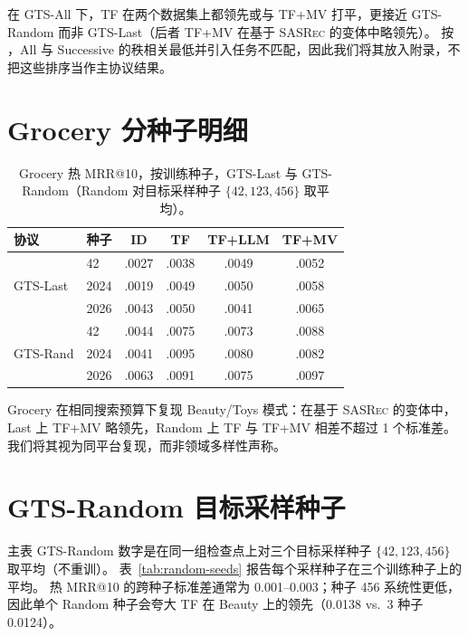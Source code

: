 \documentclass[sigconf,natbib=true,anonymous]{acmart}
\newcommand{\tfmv}{\textsc{TF+MV}\xspace}
\newcommand{\base}{\textsc{SASRec}\xspace}
\begin{document}
在 GTS-All 下，TF 在两个数据集上都领先或与 \tfmv 打平，更接近 GTS-Random 而非 GTS-Last（后者 \tfmv 在基于 \base 的变体中略领先）。
按 \citet{gusak2025time}，All 与 Successive 的秩相关最低并引入任务不匹配，因此我们将其放入附录，不把这些排序当作主协议结果。

\section{Grocery 分种子明细}
\label{app:grocery}

\begin{table}[h]
\centering
\caption{Grocery 热 MRR@10，按训练种子，GTS-Last 与 GTS-Random（Random 对目标采样种子 $\{42,123,456\}$ 取平均）。}
\label{tab:grocery-perseed}
\small
\setlength{\tabcolsep}{3pt}
\begin{tabular}{@{}llcccc@{}}
\toprule
协议 & 种子 & ID & TF & TF+LLM & TF+MV \\
\midrule
\multirow{3}{*}{GTS-Last}
 & 42    & .0027 & .0038 & .0049 & .0052 \\
 & 2024  & .0019 & .0049 & .0050 & .0058 \\
 & 2026  & .0043 & .0050 & .0041 & .0065 \\
\midrule
\multirow{3}{*}{GTS-Rand}
 & 42    & .0044 & .0075 & .0073 & .0088 \\
 & 2024  & .0041 & .0095 & .0080 & .0082 \\
 & 2026  & .0063 & .0091 & .0075 & .0097 \\
\bottomrule
\end{tabular}
\end{table}

Grocery 在相同搜索预算下复现 Beauty/Toys 模式：在基于 \base 的变体中，Last 上 \tfmv 略领先，Random 上 TF 与 \tfmv 相差不超过 1 个标准差。
我们将其视为同平台复现，而非领域多样性声称。

\section{GTS-Random 目标采样种子}
\label{app:random-seeds}

主表 GTS-Random 数字是在同一组检查点上对三个目标采样种子 $\{42,123,456\}$ 取平均（不重训）。
表~\ref{tab:random-seeds} 报告每个采样种子在三个训练种子上的平均。
热 MRR@10 的跨种子标准差通常为 0.001--0.003；种子 456 系统性更低，因此单个 Random 种子会夸大 TF 在 Beauty 上的领先（0.0138 vs.\ 3 种子 0.0124）。
\end{document}
